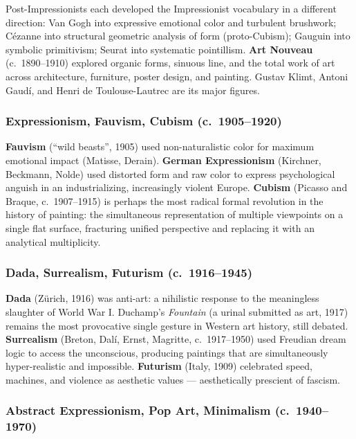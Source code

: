 \documentclass[11pt,letterpaper]{article}
\begin{document}
Post-Impressionists each developed the Impressionist vocabulary in a different direction: Van Gogh into expressive emotional color and turbulent brushwork; Cézanne into structural geometric analysis of form (proto-Cubism); Gauguin into symbolic primitivism; Seurat into systematic pointillism. \textbf{Art Nouveau} (c.~1890--1910) explored organic forms, sinuous line, and the total work of art across architecture, furniture, poster design, and painting. Gustav Klimt, Antoni Gaudí, and Henri de Toulouse-Lautrec are its major figures.

\subsubsection{Expressionism, Fauvism, Cubism (c.~1905--1920)}

\textbf{Fauvism} (``wild beasts'', 1905) used non-naturalistic color for maximum emotional impact (Matisse, Derain). \textbf{German Expressionism} (Kirchner, Beckmann, Nolde) used distorted form and raw color to express psychological anguish in an industrializing, increasingly violent Europe. \textbf{Cubism} (Picasso and Braque, c.~1907--1915) is perhaps the most radical formal revolution in the history of painting: the simultaneous representation of multiple viewpoints on a single flat surface, fracturing unified perspective and replacing it with an analytical multiplicity.

\subsubsection{Dada, Surrealism, Futurism (c.~1916--1945)}

\textbf{Dada} (Zürich, 1916) was anti-art: a nihilistic response to the meaningless slaughter of World War I. Duchamp's \emph{Fountain} (a urinal submitted as art, 1917) remains the most provocative single gesture in Western art history, still debated. \textbf{Surrealism} (Breton, Dalí, Ernst, Magritte, c.~1917--1950) used Freudian dream logic to access the unconscious, producing paintings that are simultaneously hyper-realistic and impossible. \textbf{Futurism} (Italy, 1909) celebrated speed, machines, and violence as aesthetic values --- aesthetically prescient of fascism.

\subsubsection{Abstract Expressionism, Pop Art, Minimalism (c.~1940--1970)}
\end{document}
